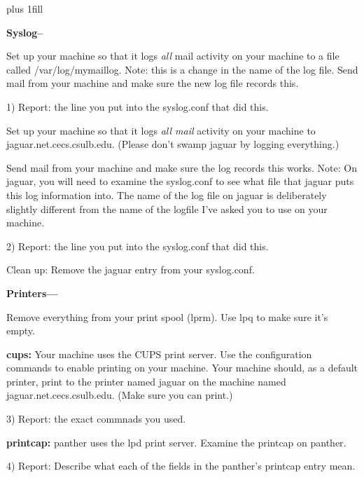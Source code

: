 
\rightskip=0pt plus 1fill

\parindent 0pt

{\bf Syslog--}

Set up your machine so that it logs {\it  all} mail activity 
on your machine to a file called {\ltt{}/var/log/mymaillog}.
Note: this is a change in the name of the log file.
Send mail from your machine and make sure the new log file records this.

1) Report: the line you put into the syslog.conf that did this.

Set up your machine so that it logs {\it all mail} activity 
on your machine to 
{\ltt{}jaguar.net.cecs.csulb.edu}.
(Please don't swamp jaguar by logging everything.)

Send mail from your machine and make sure the log records this works.
Note: On {\ltt{}jaguar}, you will need to examine the {\ltt{}syslog.conf}
to see what file that {\ltt{}jaguar} puts this log information into.
The name of the log file on jaguar is deliberately slightly different from
the name of the logfile I've asked you to use on your machine.

2) Report: the line you put into the syslog.conf that did this.

Clean up: Remove the {\ltt{}jaguar} entry from your {\ltt{}syslog.conf}.


{\bf Printers---}

Remove everything from your print spool ({\ltt{}lprm}).
Use {\ltt{}lpq} to make sure it's empty.

{\bf cups:}
Your machine uses the CUPS print server.
Use the configuration commands to enable printing on your machine.
Your machine should, as a default printer, print to the printer
named {\ltt{}jaguar} on the machine named 
{\ltt{}jaguar.net.cecs.csulb.edu}.
(Make sure you can print.)

3) Report: the exact commnads you used.


{\bf printcap:}
{\ltt{}panther} uses the {\ltt{}lpd} print server.
Examine the printcap on {\ltt{}panther}.

4) Report: Describe what each of the fields in the panther's
printcap entry mean.


\bye
